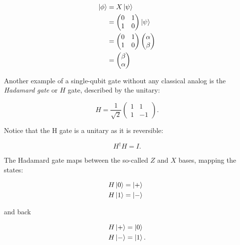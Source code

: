 \begin{align}
  \Ket{\phi} &= X \Ket{\psi} \\
             &=
               \begin{pmatrix}
                 0 & 1 \\
                 1 & 0
               \end{pmatrix}
                \Ket{\psi} \\
             &= \begin{pmatrix}
                 0 & 1 \\
                 1 & 0
               \end{pmatrix}
                \begin{pmatrix}
                  \alpha \\
                  \beta
                \end{pmatrix} \\
             &= \begin{pmatrix}
                 \beta \\
                 \alpha
               \end{pmatrix}
\end{align}

Another example of a single-qubit gate without any classical analog is the
\textit{Hadamard gate} or $H$ gate, described by the unitary:

\begin{equation}
  H = \frac{1}{\sqrt{2}}
  \begin{pmatrix}
    1 & 1 \\
    1 & -1
  \end{pmatrix}.
\end{equation}

Notice that the H gate is a unitary as it is reversible:

\begin{equation}
   H^{\dagger} H = I.
\end{equation}

The Hadamard gate maps between the so-called $Z$ and $X$ bases, mapping the
states:

\begin{align}
  H \Ket{0} &= \Ket{+} \\
  H \Ket{1} &= \Ket{-} \phantom{.}
\end{align}

and back

\begin{align}
  H \Ket{+} &= \Ket{0} \\
  H \Ket{-} &= \Ket{1}.
\end{align}

